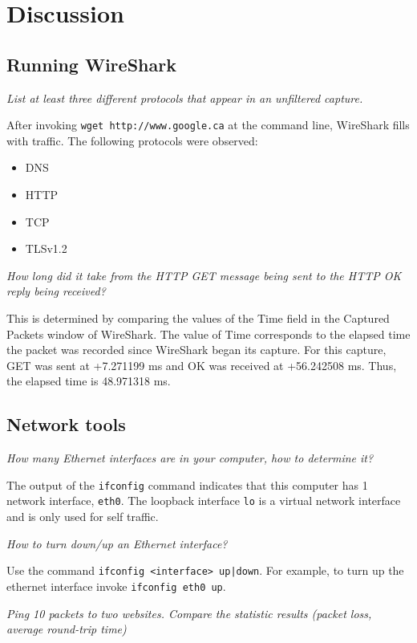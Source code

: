 \section{Discussion}\label{sec:discussion}
\subsection{Running WireShark}\label{sec:wireshark}
\textit{List at least three different protocols that appear in an unfiltered capture.}

After invoking \verb|wget http://www.google.ca| at the command line, WireShark fills with traffic.
The following protocols were observed:
\begin{itemize}
	\item DNS
	\item HTTP
	\item TCP
	\item TLSv1.2
\end{itemize}

\textit{How long did it take from the HTTP GET message being sent to the HTTP OK reply being received?}

This is determined by comparing the values of the Time field in the Captured Packets window of WireShark.
The value of Time corresponds to the elapsed time the packet was recorded since WireShark began its capture.
For this capture, GET was sent at +7.271199 ms and OK was received at +56.242508 ms.
Thus, the elapsed time is 48.971318 ms.

\subsection{Network tools}\label{sec:tools}
\textit{How many Ethernet interfaces are in your computer, how to determine it?}

The output of the \texttt{ifconfig} command indicates that this computer has 1 network interface, \texttt{eth0}.
The loopback interface \texttt{lo} is a virtual network interface and is only used for self traffic.


\textit{How to turn down/up an Ethernet interface?}

Use the command \texttt{ifconfig <interface> up|down}.
For example, to turn up the ethernet interface invoke \texttt{ifconfig eth0 up}.

\textit{Ping 10 packets to two websites.
Compare the statistic results (packet loss, average round-trip time)}


